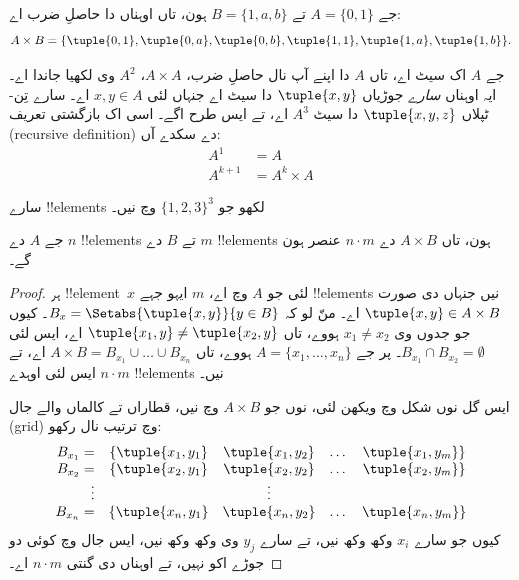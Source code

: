 \documentclass[../../../include/open-logic-section]{subfiles}
\begin{document}
\begin{ex}
جے $A = \{0, 1\}$ تے $B = \{1, a, b\}$ ہون، تاں اوہناں دا حاصلِ ضرب اے:
\[
A \times B = \{ \tuple{0, 1}, \tuple{0, a}, \tuple{0, b},
    \tuple{1, 1}, \tuple{1, a}, \tuple{1, b} \}.
\]
\end{ex}

\begin{ex}
جے $A$ اک سیٹ اے، تاں $A$ دا اپنے آپ نال حاصلِ ضرب، $A \times A$،
$A^2$ وی لکھیا جاندا اے۔ ایہ اوہناں \emph{سارے} جوڑیاں $\tuple{x, y}$ دا
سیٹ اے جنہاں لئی $x, y \in A$ اے۔ سارے تِن-ٹپلاں $\tuple{x, y, z}$ دا
سیٹ $A^3$ اے، تے ایس طرح اگے۔ اسی اک بازگشتی تعریف (recursive definition)
دے سکدے آں:
\begin{align*}
  A^1 & = A\\
  A^{k+1} & = A^k \times A
\end{align*}
\end{ex}

\begin{prob}
سارے !!{element}s لکھو جو $\{1, 2, 3\}^3$ وچ نیں۔
\end{prob}

\begin{prop}
جے $A$ دے $n$ !!{element}s تے $B$ دے $m$ !!{element}s ہون، تاں
$A \times B$ دے $n\cdot m$ عنصر ہون گے۔
\end{prop}

\begin{proof}
ہر !!{element}~$x$ لئی جو $A$ وچ اے، $m$ ایہو جہے !!{element}s نیں
جنہاں دی صورت $\tuple{x, y} \in A \times B$ اے۔ منّ لو کہ
$B_x = \Setabs{\tuple{x, y}}{y \in B}$۔ کیوں جو جدوں وی $x_1 \neq x_2$
ہووے، تاں $\tuple{x_1, y} \neq \tuple{x_2, y}$ اے، ایس لئی
$B_{x_1} \cap B_{x_2} = \emptyset$۔ پر جے $A = \{x_1, \dots, x_n\}$
ہووے، تاں $A \times B = B_{x_1} \cup \dots \cup B_{x_n}$ اے، تے ایس لئی
اوہدے $n\cdot m$ !!{element}s نیں۔

ایس گل نوں شکل وچ ویکھن لئی،  نوں جو $A \times B$
وچ نیں، قطاراں تے کالماں والے جال (grid) وچ ترتیب نال رکھو:
\[
\begin{array}{rcccc}
  B_{x_1} = & \{\tuple{x_1, y_1} & \tuple{x_1, y_2} & \dots & \tuple{x_1, y_m}\}\\
  B_{x_2} = & \{\tuple{x_2, y_1} & \tuple{x_2, y_2} & \dots & \tuple{x_2, y_m}\}\\
  \vdots & & \vdots\\
  B_{x_n} = & \{\tuple{x_n, y_1} & \tuple{x_n, y_2} & \dots & \tuple{x_n, y_m}\}
\end{array}
\]
کیوں جو سارے $x_i$ وکھ وکھ نیں، تے سارے $y_j$ وی وکھ وکھ نیں، ایس جال
وچ کوئی دو جوڑے اکو نہیں، تے اوہناں دی گنتی $n\cdot m$ اے۔
\end{proof}
\end{document}
